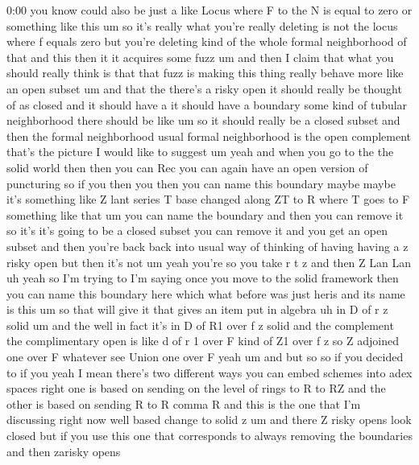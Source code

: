 \begin{unfinished}{0:00}
you  know  could  also  be  just  a  like  Locus
where  F  to  the  N  is  equal  to  zero  or
something  like
this  um  so  it's  really  what  you're
really  deleting  is  not  the  locus  where  f
equals  zero  but  you're  deleting  kind  of
the  whole  formal  neighborhood  of  that
and  this  then  it  it  acquires  some
fuzz
um  and  then  I  claim  that  what  you  should
really  think  is  that  that  fuzz  is  making
this  thing  really  behave  more  like  an
open  subset  um  and  that  the  there's  a
risky  open  it  should  really  be  thought
of  as  closed  and  it  should  have  a  it
should  have  a  boundary  some  kind  of
tubular  neighborhood  there  should  be
like  um  so  it  should  really  be  a  closed
subset  and  then  the  formal  neighborhood
usual  formal  neighborhood  is  the  open
complement  that's  the  picture  I  would
like  to
suggest
um
yeah  and  when  you  go  to  the  the  solid
world  then  then  you  can  Rec  you  can
again  have  an  open  version  of  puncturing
so  if  you  then  you  then  you  can  name
this
boundary  maybe  maybe  it's  something  like
Z  lant  series  T  base  changed  along  ZT  to
R  where  T  goes  to
F  something  like  that  um  you  can  name
the  boundary  and  then  you  can  remove  it
so  it's  it's  going  to  be  a  closed  subset
you  can  remove  it  and  you  get  an  open
subset  and  then  you're
back  back  into  usual  way  of  thinking  of
having  having  a  z  risky  open  but  then
it's
not  um  yeah  you're  so  you  take  r  t
z  and  then  Z
Lan  Lan  uh  yeah  so  I'm  trying  to  I'm
saying  once  you  move  to  the  solid
framework  then  you  can  name  this
boundary  here  which  what  before  was  just
heris  and  its  name  is
this
um  so  that  will  give  it  that  gives  an
item  put  in  algebra
uh  in  D  of  r  z
solid
um  and
the  well  in  fact  it's  in  D  of  R1  over  f
z  solid  and  the
complement  the  complimentary  open  is
like  d  of  r  1  over  F  kind  of  Z1  over  f  z
so  Z  adjoined  one  over  F  whatever  see
Union  one  over
F
yeah  um  and  but  so  so  if  you  decided  to
if  you  yeah  I
mean  there's  two  different  ways  you  can
embed  schemes  into  adex  spaces  right  one
is  based  on  sending  on  the  level  of
rings  to  R  to  RZ  and  the  other  is  based
on  sending  R  to  R  comma
R  and  this  is  the  one  that  I'm
discussing  right  now  well  based  change
to  solid  z  um  and  there  Z  risky  opens
look  closed  but  if  you  use  this  one  that
corresponds  to  always  removing  the
boundaries  and  then  zarisky  opens

\end{unfinished}
